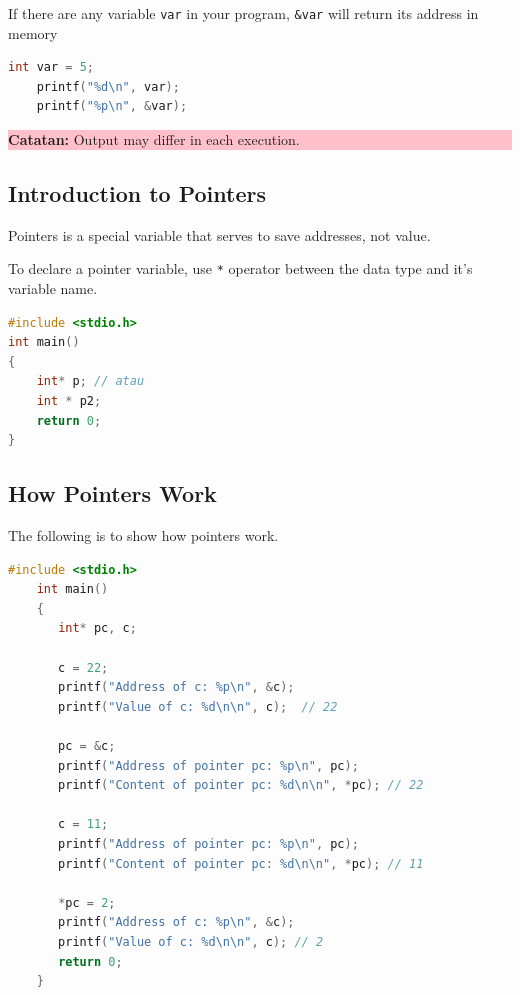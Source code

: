 If there are any variable \verb|var| in your program, \verb|&var| will return its address in memory
\begin{lstlisting}[language=c]
    int var = 5;
    printf("%d\n", var);
    printf("%p\n", &var);
\end{lstlisting}
\begin{center}
    \colorbox{pink}{\parbox{0.8\linewidth}{\textbf{Catatan:} Output may differ in each execution.}}
\end{center}

\subsection{Introduction to Pointers}

Pointers is a special variable that serves to save addresses, not value.

To declare a pointer variable, use \verb|*| operator between the data type and it's variable name.
\begin{lstlisting}[language=c]
	#include <stdio.h>
int main()
{
	int* p; // atau
    int * p2;
	return 0;
}
\end{lstlisting}


\subsection{How Pointers Work}
The following is to show how pointers work.
\begin{lstlisting}[language=c, caption={Program Example}]
    #include <stdio.h>
    int main()
    {
       int* pc, c;
       
       c = 22;
       printf("Address of c: %p\n", &c);
       printf("Value of c: %d\n\n", c);  // 22
       
       pc = &c;
       printf("Address of pointer pc: %p\n", pc);
       printf("Content of pointer pc: %d\n\n", *pc); // 22
       
       c = 11;
       printf("Address of pointer pc: %p\n", pc);
       printf("Content of pointer pc: %d\n\n", *pc); // 11
       
       *pc = 2;
       printf("Address of c: %p\n", &c);
       printf("Value of c: %d\n\n", c); // 2
       return 0;
    }
\end{lstlisting}

